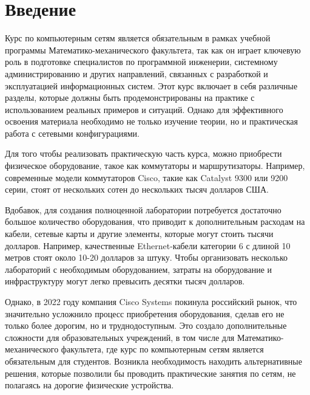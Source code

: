
\section*{Введение}
\thispagestyle{withCompileDate}

Курс по компьютерным сетям\cite{stepik} является обязательным в рамках учебной программы Математико-механического факультета, так как он играет ключевую роль в подготовке специалистов по программной инженерии, системному администрированию и других направлений, связанных с разработкой и эксплуатацией информационных систем.
Этот курс включает в себя различные разделы, которые должны быть продемонстрированы на практике с использованием реальных примеров и ситуаций.
Однако для эффективного освоения материала необходимо не только изучение теории, но и практическая работа с сетевыми конфигурациями.

Для того чтобы реализовать практическую часть курса, можно приобрести физическое оборудование, такое как коммутаторы и маршрутизаторы.
Например, современные модели коммутаторов Cisco\cite{cisco}, такие как Catalyst 9300 или 9200 серии, стоят от нескольких сотен до нескольких тысяч долларов США.

Вдобавок, для создания полноценной лаборатории потребуется достаточно большое количество оборудования, что приводит к дополнительным расходам на кабели, сетевые карты и другие элементы, которые могут стоить тысячи долларов.
Например, качественные Ethernet-кабели категории 6 с длиной 10 метров стоят около 10-20 долларов за штуку.
Чтобы организовать несколько лабораторий с необходимым оборудованием, затраты на оборудование и инфраструктуру могут легко превысить десятки тысяч долларов.

Однако, в 2022 году компания Cisco Systems покинула российский рынок, что значительно усложнило процесс приобретения оборудования, сделав его не только более дорогим, но и труднодоступным.
Это создало дополнительные сложности для образовательных учреждений, в том числе для Математико-механического факультета, где курс по компьютерным сетям является обязательным для студентов.
Возникла необходимость находить альтернативные решения, которые позволили бы проводить практические занятия по сетям, не полагаясь на дорогие физические устройства.

